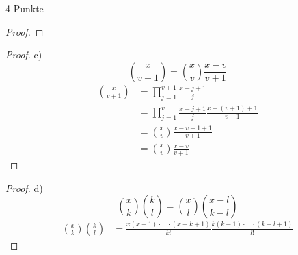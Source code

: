 \documentclass{problemset}
\begin{document}
\begin{problem}{4 Punkte}
\begin{proof}
\end{proof}
\begin{proof}
    c)
    \begin{displaymath}
        \binom{x}{v+1} = \binom{x}{v}\frac{x-v}{v+1}
    \end{displaymath}
    \begin{align}
        \binom{x}{v+1} & = \prod_{j=1}^{v+1}\frac{x-j+1}{j}                    \\
                       & = \prod_{j=1}^{v}\frac{x-j+1}{j}\frac{x-(v+1)+1}{v+1} \\
                       & = \binom{x}{v}\frac{x-v-1+1}{v+1}                     \\
                       & = \binom{x}{v}\frac{x-v}{v+1}
    \end{align}
\end{proof}
\begin{proof}
    d)
    \begin{displaymath}
        \binom{x}{k}\binom{k}{l} = \binom{x}{l}\binom{x-l}{k-l}
    \end{displaymath}
    \begin{align}
        \binom{x}{k}\binom{k}{l} & = \frac{x(x-1)\cdot\ldots\cdot(x-k+1)}{k!}\frac{k(k-1)\cdot\ldots\cdot(k-l+1)}{l!}
    \end{align}
\end{proof}
\end{problem}
\end{document}
